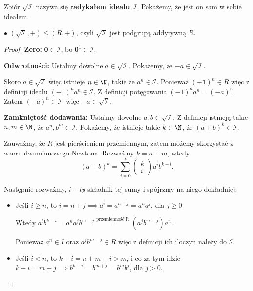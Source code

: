\begin{solution}
	Zbiór $\sqrt{\mathcal{I}} $ nazywa się \textbf{radykałem ideału $\mathcal{I}$}. Pokażemy, że jest on sam w sobie ideałem.

        \noindent $\bullet$ $\left( \sqrt{\mathcal{I}}, + \right) \le \left( R, + \right) $, czyli $\sqrt{\mathcal{I}} $ jest podgrupą addytywną $R$.
	\begin{proof}
			\noindent \textbf{Zero:} $\mathbf{0} \in \mathcal{I}$, bo $\mathbf{0}^{1} \in \mathcal{I}$.

			\noindent \textbf{Odwrotności:} Ustalmy dowolne $a \in \sqrt{\mathcal{I}}$. Pokażemy, że $-a \in \sqrt{\mathcal{I}} $. 

				Skoro $a\in \sqrt{\mathcal{I}} $ więc istnieje $n \in \N$, takie że $a^{n} \in \mathcal{I}$. Ponieważ $\left( -\mathbf{1} \right)^{n}\in R $ więc z definicji ideału $\left( -1 \right)^{n}a^{n} \in \mathcal{I}$. Z definicji potęgowania $\left( -1 \right)^{n}a^{n} = \left( -a \right) ^{n}$. Zatem $\left( -a \right) ^{n}\in \mathcal{I}$, więc $-a \in \sqrt{\mathcal{I}} $.

			\noindent \textbf{Zamkniętość dodawania:} Ustalmy dowolne $a,b \in \sqrt{\mathcal{I}} $. Z definicji istnieją takie $n,m \in \N$, że $a^{n}, b^{m} \in \mathcal{I}$. Pokażemy, że istnieje takie $k\in \N$, że $\left( a + b \right)^{k} \in \mathcal{I}$.

			Zauważmy, że $R$ jest pierścieniem przemiennym, zatem możemy skorzystać z wzoru dwumianowego Newtona. Rozważmy $k = n+m$, wtedy
			 \[
				 \left( a + b \right)^{k} = \sum_{i=0}^{k} \begin{pmatrix} k \\ i \end{pmatrix} a^{i}b^{k-i}
			.\] 

			Następnie rozważmy, $i-ty$ składnik  tej sumy i spójrzmy na niego dokładniej:
			\begin{itemize}
				\item Jeśli $i \ge  n$, to  $i = n + j \implies a^{i} = a^{n+j} = a^{n}a^{j}$, dla $j\ge 0$ 

					Wtedy $a^{i}b^{k-i} = a^{n}a^{j}b^{m-j} \overset{\text{przemienność R}}{=} \left( a^{j}b^{m-j} \right) a^{n}$. 
					
					Ponieważ $a^{n} \in I$ oraz $a^{j}b^{m-j} \in R$ więc z definicji ich iloczyn należy do $\mathcal{I}$.
				\item Jeśli $i<n$, to $k-i = n+m - i > m$, i co za tym idzie  $k-i = m+j \implies b^{k-i} = b^{m+j}= b^{m}b^{j}$, dla $j> 0$. 


\end{itemize}
\end{proof}
\end{solution}
